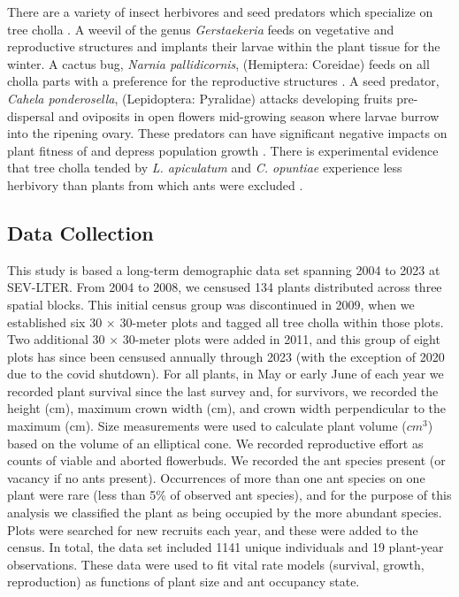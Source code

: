 \documentclass[11pt]{article}
\begin{document}
	There are a variety of insect herbivores and seed predators which specialize on tree cholla \citep{Mann1969}. 
	A weevil of the genus \textit{Gerstaekeria} feeds on vegetative and reproductive structures and implants their larvae within the plant tissue for the winter. 
	A cactus bug, \textit{Narnia pallidicornis}, (Hemiptera: Coreidae) feeds on all cholla parts with a preference for the reproductive structures \citep{Miller2006}.
	A seed predator, \textit{Cahela ponderosella}, (Lepidoptera: Pyralidae) attacks developing fruits pre-dispersal and oviposits in open flowers mid-growing season where larvae burrow into the ripening ovary. 
	These predators can have significant negative impacts on plant fitness of and depress population growth \citep{Miller2009}.
	There is experimental evidence that tree cholla tended by \textit{L. apiculatum} and \textit{C. opuntiae} experience less herbivory than plants from which ants were excluded \citep{Miller2007}. 
	
	\subsection*{Data Collection}
	This study is based a long-term demographic data set spanning 2004 to 2023 at SEV-LTER. 
	From 2004 to 2008, we censused 134 plants distributed across three spatial blocks. 
	This initial census group was discontinued in 2009, when we established six 30 $\times$ 30-meter plots and tagged all tree cholla within those plots. 
	Two additional 30 $\times$ 30-meter plots were added in 2011, and this group of eight plots has since been censused annually through 2023 (with the exception of 2020 due to the covid shutdown). 
	For all plants, in May or early June of each year we recorded plant survival since the last survey and, for survivors, we recorded the height (cm), maximum crown width (cm), and crown width perpendicular to the maximum (cm).
	Size measurements were used to calculate plant volume ($cm^3$) based on the volume of an elliptical cone. 
	We recorded reproductive effort as counts of viable and aborted flowerbuds. 
	We recorded the ant species present (or vacancy if no ants present).
	Occurrences of more than one ant species on one plant were rare (less than 5\% of observed ant species), and for the purpose of this analysis we classified the plant as being occupied by the more abundant species. 
	Plots were searched for new recruits each year, and these were added to the census.
	In total, the data set included 1141 unique individuals and 19 plant-year observations. 
	These data were used to fit vital rate models (survival, growth, reproduction) as functions of plant size and ant occupancy state. 
	
\end{document}
